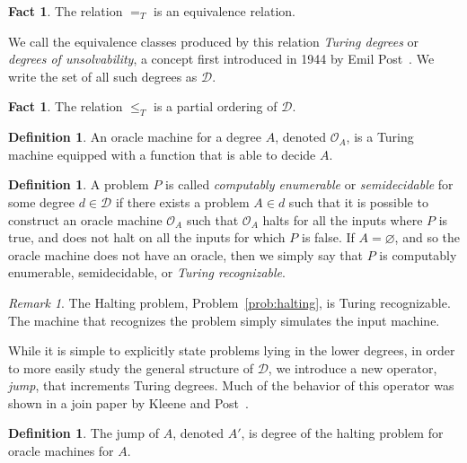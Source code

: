 \documentclass[psamsfonts]{amsart}
\theoremstyle{definition}
\newtheorem{defn}[thm]{Definition}
\newtheorem{fact}[thm]{Fact}
\theoremstyle{remark}
\newtheorem{rem}[thm]{Remark}
\numberwithin{equation}{section}
\begin{document}
\begin{fact}
  The relation $=_T$ is an equivalence relation.
\end{fact}

We call the equivalence classes produced by this relation \emph{Turing degrees}
or \emph{degrees of unsolvability}, a concept first introduced in
1944 by Emil Post~\cite{post44:_recur}. We write the set of all such degrees as $\mathcal{D}$.

\begin{fact}
  The relation $\leq_T$ is a partial ordering of $\mathcal{D}$.
\end{fact}

\begin{defn}
  An oracle machine for a degree $A$, denoted $\mathcal{O}_A$, is a Turing
  machine equipped with a function that is able to decide $A$.
\end{defn}

\begin{defn}
  A problem $P$ is called \emph{computably enumerable} or \emph{semidecidable}
  for some degree $d\in\mathcal{D}$ if there exists a problem $A\in d$ such that
  it is possible to construct an oracle machine $\mathcal{O}_A$ such that
  $\mathcal{O}_A$ halts for all the inputs where $P$ is true, and does not halt
  on all the inputs for which $P$ is false. If $A=\varnothing$, and so the
  oracle machine does not have an oracle, then we simply say that $P$ is
  computably enumerable, semidecidable, or \emph{Turing recognizable}.
\end{defn}
\begin{rem}
  The Halting problem, Problem~\ref{prob:halting}, is Turing recognizable. The
  machine that recognizes the problem simply simulates the input machine.
\end{rem}

While it is simple to explicitly state problems lying in the lower degrees,
in order to more easily study the general structure of $\mathcal{D}$, we
introduce a new operator, \emph{jump}, that increments Turing degrees. Much of
the behavior of this operator was shown in a join paper by Kleene and Post~\cite{kleene54_upper_semi_lattic_degrees_recur_unsol}.

\begin{defn}
  The jump of $A$, denoted $A'$, is degree of the halting problem for oracle
  machines for $A$.
\end{defn}
\end{document}
